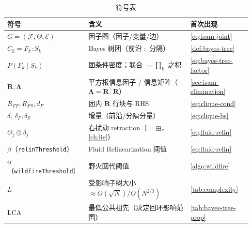 \begin{table}[H]\centering\small
\caption{符号表}
\begin{tabular}{lll}
\toprule
符号 & 含义 & 首次出现 \\
\midrule
$G=(\mathcal{F},\Theta,\mathcal{E})$ & 因子图（因子/变量/边） & \cref{eq:isam-joint} \\
$C_k=F_k:S_k$ & Bayes 树团（前沿 $:$ 分隔） & \cref{def:bayes-tree} \\
$P(F_k\mid S_k)$ & 团条件密度；联合 $=\prod_k$ 之积 & \cref{eq:bayes-tree-factor} \\
$\mathbf{R},\boldsymbol{\Lambda}$ & 平方根信息因子 / 信息矩阵（$\boldsymbol{\Lambda}=\mathbf{R}^\top\mathbf{R}$） & \cref{sec:isam-elimination} \\
$R_{FF},R_{FS},d_F$ & 团内 $\mathbf{R}$ 行块与 RHS & \cref{eq:clique-cond} \\
$\delta,\ \delta_F,\delta_S$ & 增量（前沿/分隔分量） & \cref{eq:clique-bs} \\
$\Theta_j\oplus\delta_j$ & 右扰动 retraction（$=\boxplus$，\cref{ch:lie}） & \cref{eq:fluid-relin} \\
$\beta$（\texttt{relinThreshold}） & Fluid Relinearization 阈值 & \cref{eq:fluid-relin} \\
$\alpha$（\texttt{wildfireThreshold}） & 野火回代阈值 & \cref{algo:wildfire} \\
$L$ & 受影响子树大小 $\approx O(\sqrt N)/O(N^{2/3})$ & \cref{tab:complexity} \\
LCA & 最低公共祖先（决定回环影响范围） & \cref{tab:bayes-tree-prop} \\
\bottomrule
\end{tabular}
\end{table}

